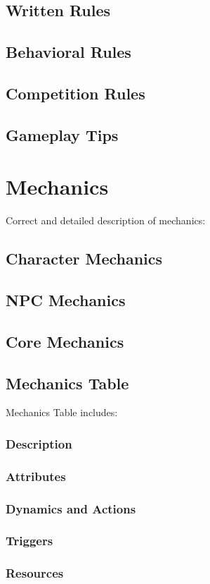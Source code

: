 \subsection{Written Rules}
\subsection{Behavioral Rules}
\subsection{Competition Rules}
\subsection{Gameplay Tips}

\section{Mechanics}
Correct and detailed description of mechanics:
\subsection{Character Mechanics}
\subsection{NPC Mechanics}
\subsection{Core Mechanics}
\subsection{Mechanics Table}
Mechanics Table includes:
\subsubsection{Description}
\subsubsection{Attributes}
\subsubsection{Dynamics and Actions}
\subsubsection{Triggers}
\subsubsection{Resources}

